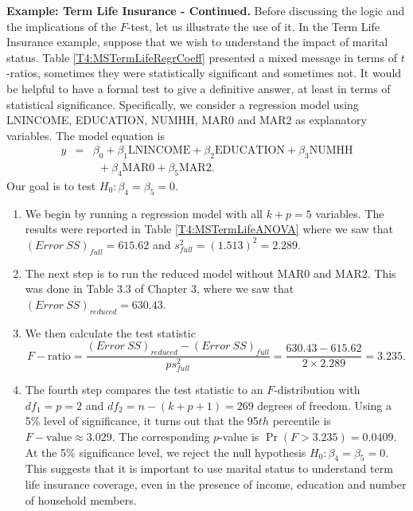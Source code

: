 \textbf{Example: Term Life Insurance - Continued.} Before discussing
the logic and the implications of the $F$-test, let us illustrate
the use of it. In the Term Life Insurance example, suppose that we
wish to understand the impact of marital status. Table
\ref{T4:MSTermLifeRegrCoeff} presented a mixed message in terms of
$t$-ratios, sometimes they were statistically significant and
sometimes not. It would be helpful to have a formal test to give a
definitive answer, at least in terms of statistical significance.
Specifically, we consider a regression model using LNINCOME,
EDUCATION, NUMHH, MAR0 and MAR2 as explanatory variables. The model
equation is
\begin{eqnarray*}
y &=& \beta_0 + \beta_1 \textrm{LNINCOME} +\beta_2
\textrm{EDUCATION} + \beta_3 \textrm{NUMHH} \\
 & & ~~ +\beta_4 \textrm{MAR0} +\beta_5\textrm{MAR2}.
\end{eqnarray*}
Our goal is to test $H_0: \beta_4 = \beta_5 = 0 $.

\begin{enumerate}
\item We begin by running a regression model
with all $k+p=5$ variables. The results were reported in Table
\ref{T4:MSTermLifeANOVA} where we saw that $(Error~SS)_{full} =
615.62$ and $s_{full}^2 = (1.513)^2 = 2.289$.

\item The next step is to run the reduced model without MAR0 and MAR2.
This was done in Table 3.3 of Chapter 3, where we saw that
$(Error~SS)_{reduced} = 630.43.$

\item We then calculate the test statistic
\begin{equation*}
F-\textrm{ratio}=\frac{(Error~SS)_{reduced}-(Error~SS)_{full}}{ps_{full}^2}
= \frac{630.43 -615.62}{2 \times 2.289} = 3.235 .
\end{equation*}

\item The fourth step compares the test statistic to an $F$-distribution with
$df_1=p=2$ and $df_2 = n-(k+p+1) = 269$ degrees of freedom. Using a
5\% level of significance, it turns out that the 95$th$ percentile
is $F-\textrm{value} \approx 3.029$. The corresponding $p$-value is
$\Pr(F > 3.235) = 0.0409$. At the 5\% significance level, we reject
the null hypothesis $H_0:\beta_4=\beta_5=0$. This suggests that it
is important to use marital status to understand term life insurance
coverage, even in the presence of income, education and number of
household members.

\end{enumerate}

